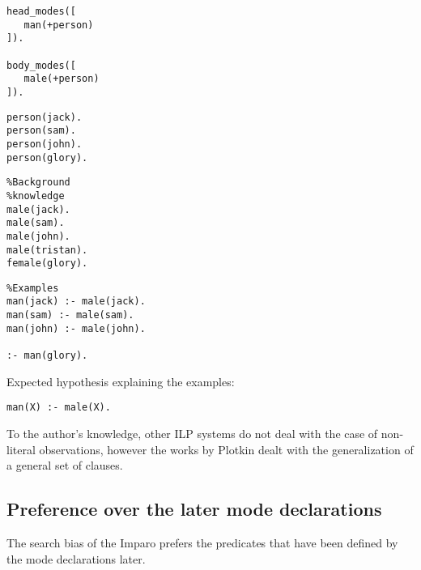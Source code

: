 \begin{minipage}[t]{.25\textwidth}
\begin{lstlisting}
head_modes([
   man(+person)
]).

body_modes([
   male(+person)
]).\end{lstlisting}
\end{minipage}
\begin{minipage}[t]{.20\textwidth}
\begin{lstlisting}
person(jack).
person(sam).
person(john).
person(glory).
\end{lstlisting}
\end{minipage}
\begin{minipage}[t]{.20\textwidth}
\begin{lstlisting}
%Background
%knowledge
male(jack).
male(sam).
male(john).
male(tristan).
female(glory).
\end{lstlisting}
\end{minipage}
\begin{minipage}[t]{.25\textwidth}
\begin{lstlisting}
%Examples
man(jack) :- male(jack).
man(sam) :- male(sam).
man(john) :- male(john).

:- man(glory).
\end{lstlisting}
\end{minipage}

Expected hypothesis explaining the examples:

\begin{lstlisting}
man(X) :- male(X).
\end{lstlisting}

To the author's knowledge, other ILP systems do not deal with the case of non-literal observations, however the works by Plotkin dealt with the generalization of a general set of clauses.

\subsection{Preference over the later mode declarations}
The search bias of the Imparo prefers the predicates that have been defined by the mode declarations later.

